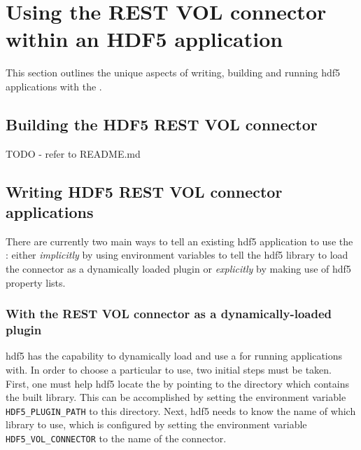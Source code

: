 \documentclass[../users_guide.tex]{subfiles}
\begin{document}
\section{Using the REST VOL connector within an HDF5 application}

This section outlines the unique aspects of writing, building and running
\acrshort{hdf5} applications with the \rvc{}.

\subsection{Building the HDF5 REST VOL connector}

TODO - refer to README.md


\subsection{Writing HDF5 REST VOL connector applications}

There are currently two main ways to tell an existing \acrshort{hdf5} application to use
the \rvc{}: either \textit{implicitly} by using environment
variables to tell the \acrshort{hdf5} library to load the connector as a dynamically loaded
plugin or \textit{explicitly} by making use of \acrshort{hdf5} property lists.

\subsubsection{With the REST VOL connector as a dynamically-loaded plugin}
\label{sec:dynamic_plugin}

\acrshort{hdf5} has the capability to dynamically load and use a \vc{} for running
applications with. In order to choose a particular \vc{} to use, two
initial steps must be taken. First, one must help \acrshort{hdf5} locate the \vc{}
by pointing to the directory which contains the built library. This can be
accomplished by setting the environment variable \texttt{HDF5\_PLUGIN\_PATH} to
this directory. Next, \acrshort{hdf5} needs to know the name of which library to use, which
is configured by setting the environment variable \texttt{HDF5\_VOL\_CONNECTOR}
to the name of the connector.
\end{document}
